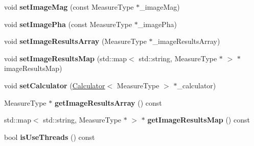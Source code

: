 \begin{DoxyCompactItemize}
\item 
void {\bfseries set\+Image\+Mag} (const Measure\+Type $\ast$\+\_\+image\+Mag)\hypertarget{class_ox_1_1_image_calculator_adc4840c957f9a30916ce93662c2198cc}{}\label{class_ox_1_1_image_calculator_adc4840c957f9a30916ce93662c2198cc}

\item 
void {\bfseries set\+Image\+Pha} (const Measure\+Type $\ast$\+\_\+image\+Pha)\hypertarget{class_ox_1_1_image_calculator_a8c327b858cdc2167baa5c96e876fe879}{}\label{class_ox_1_1_image_calculator_a8c327b858cdc2167baa5c96e876fe879}

\item 
void {\bfseries set\+Image\+Results\+Array} (Measure\+Type $\ast$\+\_\+image\+Results\+Array)\hypertarget{class_ox_1_1_image_calculator_a067ee615e45c131efda465ab006a3edc}{}\label{class_ox_1_1_image_calculator_a067ee615e45c131efda465ab006a3edc}

\item 
void {\bfseries set\+Image\+Results\+Map} (std\+::map$<$ std\+::string, Measure\+Type $\ast$ $>$ $\ast$image\+Results\+Map)\hypertarget{class_ox_1_1_image_calculator_ac7d8f5e08f7a8d8fd038f5d44c5b6613}{}\label{class_ox_1_1_image_calculator_ac7d8f5e08f7a8d8fd038f5d44c5b6613}

\item 
void {\bfseries set\+Calculator} (\hyperlink{class_ox_1_1_calculator}{Calculator}$<$ Measure\+Type $>$ $\ast$\+\_\+calculator)\hypertarget{class_ox_1_1_image_calculator_a6ba9239e4462b3d7811b8032d9704ce1}{}\label{class_ox_1_1_image_calculator_a6ba9239e4462b3d7811b8032d9704ce1}

\item 
Measure\+Type $\ast$ {\bfseries get\+Image\+Results\+Array} () const \hypertarget{class_ox_1_1_image_calculator_aa91a227b27fd21beb362e16c9df9af50}{}\label{class_ox_1_1_image_calculator_aa91a227b27fd21beb362e16c9df9af50}

\item 
std\+::map$<$ std\+::string, Measure\+Type $\ast$ $>$ $\ast$ {\bfseries get\+Image\+Results\+Map} () const \hypertarget{class_ox_1_1_image_calculator_ad101ab2e2963202b3728c7ffd5d861be}{}\label{class_ox_1_1_image_calculator_ad101ab2e2963202b3728c7ffd5d861be}

\item 
bool {\bfseries is\+Use\+Threads} () const \hypertarget{class_ox_1_1_image_calculator_a9adb3d4b4485033d24403199a19b4925}{}\label{class_ox_1_1_image_calculator_a9adb3d4b4485033d24403199a19b4925}


\end{DoxyCompactItemize}
